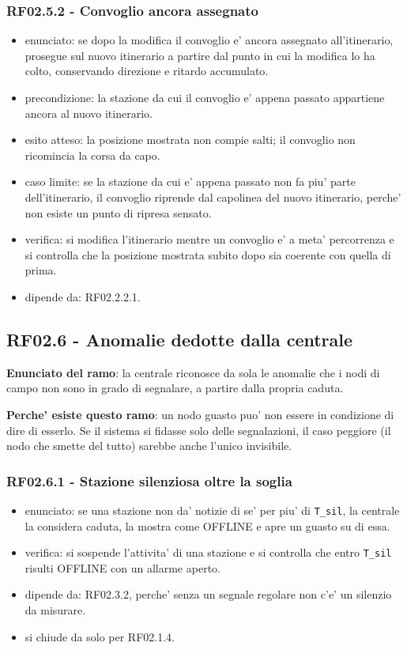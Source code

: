 \documentclass[11pt]{article}
\begin{document}
\subsubsection{RF02.5.2 - Convoglio ancora assegnato}
\label{sec:orgb2a99cf}
\begin{itemize}
\item enunciato: se dopo la modifica il convoglio e' ancora assegnato all'itinerario, prosegue sul nuovo
itinerario a partire dal punto in cui la modifica lo ha colto, conservando direzione e ritardo
accumulato.
\item precondizione: la stazione da cui il convoglio e' appena passato appartiene ancora al nuovo
itinerario.
\item esito atteso: la posizione mostrata non compie salti; il convoglio non ricomincia la corsa da capo.
\item caso limite: se la stazione da cui e' appena passato non fa piu' parte dell'itinerario, il convoglio
riprende dal capolinea del nuovo itinerario, perche' non esiste un punto di ripresa sensato.
\item verifica: si modifica l'itinerario mentre un convoglio e' a meta' percorrenza e si controlla che la
posizione mostrata subito dopo sia coerente con quella di prima.
\item dipende da: RF02.2.2.1.
\end{itemize}
\subsection{RF02.6 - Anomalie dedotte dalla centrale}
\label{sec:org1ca0815}

\textbf{Enunciato del ramo}: la centrale riconosce da sola le anomalie che i nodi di campo non sono in grado
di segnalare, a partire dalla propria caduta.

\textbf{Perche' esiste questo ramo}: un nodo guasto puo' non essere in condizione di dire di esserlo. Se il
sistema si fidasse solo delle segnalazioni, il caso peggiore (il nodo che smette del tutto) sarebbe
anche l'unico invisibile.
\subsubsection{RF02.6.1 - Stazione silenziosa oltre la soglia}
\label{sec:orgdfdeeb4}
\begin{itemize}
\item enunciato: se una stazione non da' notizie di se' per piu' di \texttt{T\_sil}, la centrale la considera
caduta, la mostra come OFFLINE e apre un guasto su di essa.
\item verifica: si sospende l'attivita' di una stazione e si controlla che entro \texttt{T\_sil} risulti OFFLINE
con un allarme aperto.
\item dipende da: RF02.3.2, perche' senza un segnale regolare non c'e' un silenzio da misurare.
\item si chiude da solo per RF02.1.4.
\end{itemize}
\end{document}
